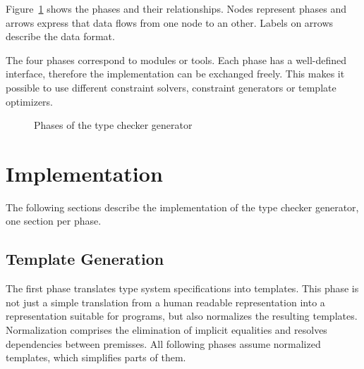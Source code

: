 Figure~\ref{fig:phases} shows the phases and their
relationships. Nodes represent phases and arrows express that data flows
from one node to an other. Labels on arrows describe the data format.

The four phases correspond to modules or tools. Each phase has a
well-defined interface, therefore the implementation can be exchanged
freely. This makes it possible to use different constraint solvers,
constraint generators or template optimizers.

\begin{figure}
\caption{Phases of the type checker generator}
\label{fig:phases}
\end{figure}
\section{Implementation}
\label{sec:implementation}
The following sections describe the implementation of the type checker
generator, one section per phase.

\subsection{Template Generation}
\label{sec:constraint-templates}
The first phase translates type system specifications into
templates. This phase is not just a simple translation from a human
readable representation into a representation suitable for programs,
but also normalizes the resulting templates. Normalization comprises
the elimination of implicit equalities and resolves dependencies
between premisses. All following phases assume normalized templates,
which simplifies parts of them.

